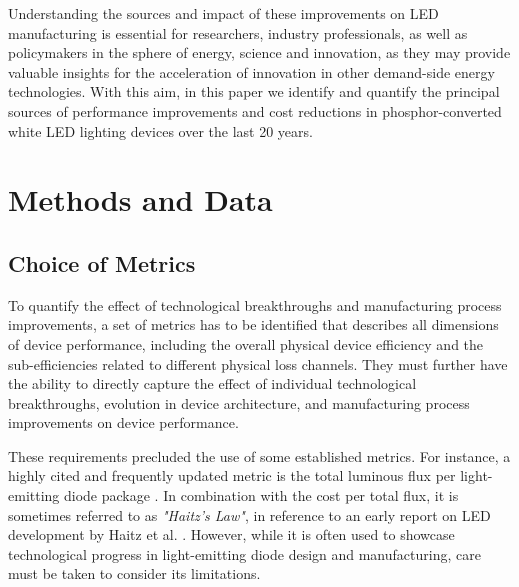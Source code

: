\documentclass[a4paper,nocompress]{spie}  %
\begin{document}
    Understanding the sources and impact of these improvements on LED manufacturing is essential for researchers, industry professionals, as well as policymakers in the sphere of energy, science and innovation, as they may provide valuable insights for the acceleration of innovation in other demand-side energy technologies. With this aim, in this paper we identify and quantify the principal sources of performance improvements and cost reductions in phosphor-converted white LED lighting devices over the last 20 years. 

\section{Methods and Data}
\label{sec:methods}

\subsection{Choice of Metrics}
\label{subsec:metrics}

    To quantify the effect of technological breakthroughs and manufacturing process improvements, a set of metrics has to be identified that describes all dimensions of device performance, including the overall physical device efficiency and the sub-efficiencies related to different physical loss channels. They must further have the ability to directly capture the effect of individual technological breakthroughs, evolution in device architecture, and manufacturing process improvements on device performance.
    
    These requirements precluded the use of some established metrics. For instance, a highly cited and frequently updated metric is the total luminous flux per light-emitting diode package \cite{Liu2009,haitz2011solid,cho2017white,Fontoynont2018}. In combination with the cost per total flux, it is sometimes referred to as \textit{"Haitz's Law"}, in reference to an early report on LED development by Haitz et al. \cite{haitz1999case}. However, while it is often used to showcase technological progress in light-emitting diode design and manufacturing, care must be taken to consider its limitations.
    
\end{document}
